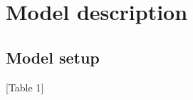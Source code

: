 \documentclass[smallextended]{svjour3}       %
\begin{document}
\section{Model description}


\subsection{Model setup}

[Table 1]
\end{document}
